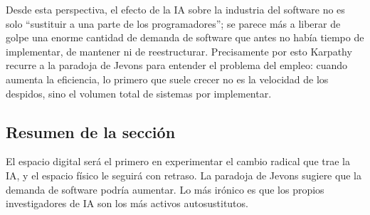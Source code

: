 Desde esta perspectiva, el efecto de la IA sobre la industria del software no es solo ``sustituir a una parte de los programadores''; se parece más a liberar de golpe una enorme cantidad de demanda de software que antes no había tiempo de implementar, de mantener ni de reestructurar. Precisamente por esto Karpathy recurre a la paradoja de Jevons para entender el problema del empleo: cuando aumenta la eficiencia, lo primero que suele crecer no es la velocidad de los despidos, sino el volumen total de sistemas por implementar.

\subsection{Resumen de la sección}

El espacio digital será el primero en experimentar el cambio radical que trae la IA, y el espacio físico le seguirá con retraso. La paradoja de Jevons sugiere que la demanda de software podría aumentar. Lo más irónico es que los propios investigadores de IA son los más activos autosustitutos.
